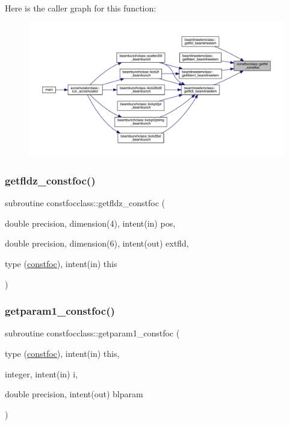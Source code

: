 Here is the caller graph for this function\+:\nopagebreak
\begin{figure}[H]
\begin{center}
\leavevmode
\includegraphics[width=350pt]{namespaceconstfocclass_a34425bf98b4a4cff016108f25a629dff_icgraph}
\end{center}
\end{figure}
\mbox{\label{namespaceconstfocclass_a11f9a7cebf07bf044485eb4686f9357e}} 
\subsubsection{\texorpdfstring{getfldz\_constfoc()}{getfldz\_constfoc()}}
{\footnotesize\ttfamily subroutine constfocclass\+::getfldz\+\_\+constfoc (\begin{DoxyParamCaption}\item[{double precision, dimension(4), intent(in)}]{pos,  }\item[{double precision, dimension(6), intent(out)}]{extfld,  }\item[{type (\mbox{\hyperlink{namespaceconstfocclass_structconstfocclass_1_1constfoc}{constfoc}}), intent(in)}]{this }\end{DoxyParamCaption})}

\mbox{\label{namespaceconstfocclass_ab906b8830f5fb2cec09297d5004494e9}} 
\subsubsection{\texorpdfstring{getparam1\_constfoc()}{getparam1\_constfoc()}}
{\footnotesize\ttfamily subroutine constfocclass\+::getparam1\+\_\+constfoc (\begin{DoxyParamCaption}\item[{type (\mbox{\hyperlink{namespaceconstfocclass_structconstfocclass_1_1constfoc}{constfoc}}), intent(in)}]{this,  }\item[{integer, intent(in)}]{i,  }\item[{double precision, intent(out)}]{blparam }\end{DoxyParamCaption})}

